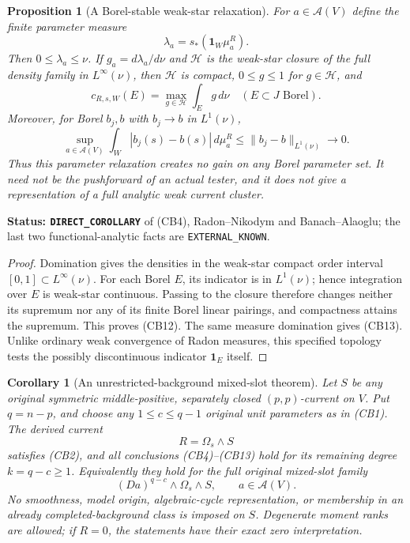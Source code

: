 \documentclass[11pt,a4paper]{article}
\numberwithin{equation}{section}
\newtheorem{proposition}[theorem]{Proposition}
\newtheorem{corollary}[theorem]{Corollary}
\theoremstyle{definition}
\theoremstyle{remark}
\begin{document}
\begin{proposition}[A Borel-stable weak-star relaxation]
\label{prop:r12-band-weak-star-relaxation}
For $a\in\mathcal A(V)$ define the finite parameter measure
\[
                    \lambda_a=s_*(\mathbf1_W\mu^R_a).
 \tag{CB11}
\]
Then $0\leq\lambda_a\leq\nu$. If $g_a=d\lambda_a/d\nu$ and
$\mathcal H$ is the weak-star closure of the full density family
in $L^\infty(\nu)$, then $\mathcal H$ is compact,
$0\leq g\leq1$ for $g\in\mathcal H$, and
\[
                c_{R,s,W}(E)=\max_{g\in\mathcal H}\int_Eg\,d\nu
                                    \quad(E\subset J\text{ Borel}).
 \tag{CB12}
\]
Moreover, for Borel $b_j,b$ with $b_j\to b$ in $L^1(\nu)$,
\[
 \sup_{a\in\mathcal A(V)}
 \int_W |b_j(s)-b(s)|\,d\mu^R_a
                              \leq\|b_j-b\|_{L^1(\nu)}\longrightarrow0.
 \tag{CB13}
\]
Thus this parameter relaxation creates no gain on \emph{any}
Borel parameter set. It need not be the pushforward of an actual
tester, and it does not give a representation of a full analytic
weak current cluster.
\end{proposition}

\noindent\textbf{Status: \texttt{DIRECT\_COROLLARY}} of (CB4),
Radon--Nikodym and Banach--Alaoglu; the last two functional-analytic
facts are \texttt{EXTERNAL\_KNOWN}.

\begin{proof}
Domination gives the densities in the weak-star compact order
interval $[0,1]\subset L^\infty(\nu)$. For each Borel $E$,
its indicator is in $L^1(\nu)$; hence integration over $E$
is weak-star continuous. Passing to the closure therefore changes
neither its supremum nor any of its finite Borel linear pairings,
and compactness attains the supremum. This proves (CB12).
The same measure domination gives (CB13). Unlike ordinary weak
convergence of Radon measures, this specified topology tests the
possibly discontinuous indicator $\mathbf1_E$ itself.
\end{proof}

\begin{corollary}[An unrestricted-background mixed-slot theorem]
\label{cor:r12-arbitrary-S-band-capacity}
Let $S$ be \emph{any} original symmetric middle-positive,
separately closed $(p,p)$-current on $V$. Put $q=n-p$, and
choose any $1\leq c\leq q-1$ original unit parameters as in
(CB1). The derived current
\[
                             R=\Omega_s\wedge S
 \tag{CB14}
\]
satisfies (CB2), and all conclusions (CB4)--(CB13) hold for
its remaining degree $k=q-c\geq1$. Equivalently they hold
for the full original mixed-slot family
\[
                    (Da)^{q-c}\wedge\Omega_s\wedge S,
                                  \qquad a\in\mathcal A(V).
 \tag{CB15}
\]
No smoothness, model origin, algebraic-cycle representation, or
membership in an already completed-background class is imposed
on $S$. Degenerate moment ranks are allowed; if $R=0$, the
statements have their exact zero interpretation.
\end{corollary}
\end{document}
